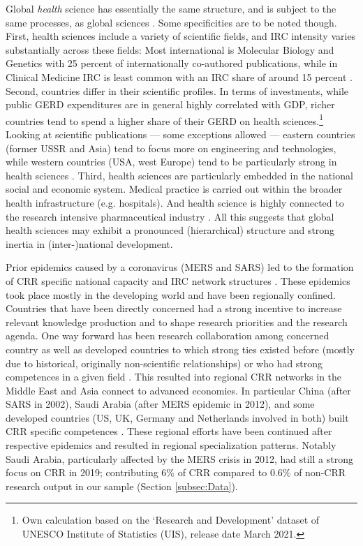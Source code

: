 Global \textit{health} science has essentially the same structure, and is subject to the same processes, as global sciences \citep{cantner2014international,wagner2017growth,gazni2012mapping}. Some specificities are to be noted though. First, health sciences include a variety of scientific fields, and IRC intensity varies substantially across these fields: Most international is Molecular Biology and Genetics with 25 percent of internationally co-authored publications, while in Clinical Medicine IRC is least common with an IRC share of around 15 percent \citep{gazni2012mapping}. Second, countries differ in their scientific profiles. In terms of investments, while public GERD expenditures are in general highly correlated with GDP, richer countries tend to spend a higher share of their GERD on health sciences.\footnote{Own calculation based on the `Research and Development' dataset of UNESCO Institute of Statistics (UIS), release date March 2021.} Looking at scientific publications --- some exceptions allowed --- eastern countries (former USSR and Asia) tend to focus more on engineering and technologies, while western countries (USA, west Europe) tend to be particularly strong in health sciences \citep{glanzel2001national}.  Third, health sciences are particularly embedded in the national social and economic system. Medical practice is carried out within the broader health infrastructure (e.g. hospitals). And health science is highly connected to the research intensive pharmaceutical industry \citep{zucker1994intellectual}. All this suggests that global health sciences may exhibit a pronounced (hierarchical) structure and strong inertia in (inter-)national development. 

Prior epidemics caused by a coronavirus (MERS and SARS) led to the formation of CRR specific national capacity and IRC network structures \citep{haghani2020covid,mendes2020shifting,zhang2020scientific}. These epidemics took place mostly in the developing world and have been regionally confined. Countries that have been directly concerned had a strong incentive to increase relevant knowledge production and to shape research priorities and the research agenda. One way forward has been research collaboration among concerned country as well as developed countries to which strong ties existed before (mostly due to historical, originally non-scientific relationships) or who had strong competences in a given field \citep{zhang2020scientific,haghani2020covid}. This resulted into regional CRR networks in the Middle East and Asia connect to advanced economies. In particular China (after SARS in 2002), Saudi Arabia (after MERS epidemic in 2012), and some developed countries (US, UK, Germany and Netherlands involved in both) built CRR specific competences \citep{mendes2020shifting,zhang2020scientific}. These regional efforts have been continued after respective epidemics and resulted in regional specialization patterns. Notably Saudi Arabia, particularly affected by the MERS crisis in 2012, had still a strong focus on CRR in 2019; contributing 6\% of CRR compared to 0.6\% of non-CRR research output in our sample (Section \ref{subsec:Data}).  

